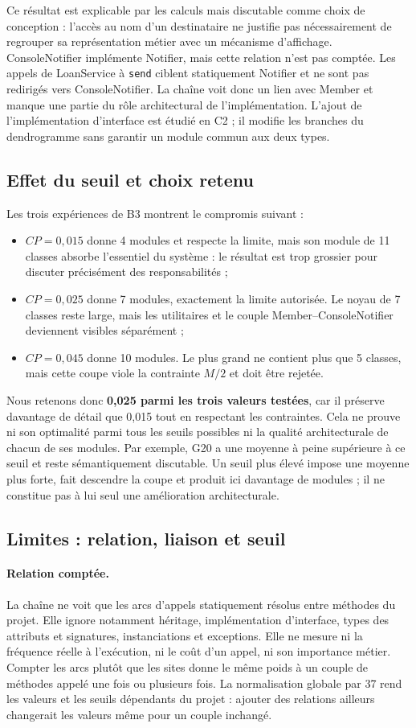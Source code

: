 \documentclass[11pt,a4paper]{article}
\begin{document}
Ce résultat est explicable par les calculs mais discutable comme choix de
conception : l'accès au nom d'un destinataire ne justifie pas nécessairement
de regrouper sa représentation métier avec un mécanisme d'affichage.
ConsoleNotifier implémente Notifier, mais cette relation n'est pas comptée.
Les appels de LoanService à \texttt{send} ciblent statiquement Notifier et
ne sont pas redirigés vers ConsoleNotifier. La chaîne voit donc un lien avec
Member et manque une partie du rôle architectural de l'implémentation.
L'ajout de l'implémentation d'interface est étudié en C2 ; il modifie les
branches du dendrogramme sans garantir un module commun aux deux types.

\subsection{Effet du seuil et choix retenu}
Les trois expériences de B3 montrent le compromis suivant :
\begin{itemize}
\item $CP=0{,}015$ donne 4 modules et respecte la limite, mais son module de
11 classes absorbe l'essentiel du système : le résultat est trop grossier
pour discuter précisément des responsabilités ;
\item $CP=0{,}025$ donne 7 modules, exactement la limite autorisée. Le noyau
de 7 classes reste large, mais les utilitaires et le couple Member--ConsoleNotifier
deviennent visibles séparément ;
\item $CP=0{,}045$ donne 10 modules. Le plus grand ne contient plus que
5 classes, mais cette coupe viole la contrainte $M/2$ et doit être rejetée.
\end{itemize}
Nous retenons donc \textbf{0,025 parmi les trois valeurs testées}, car il
préserve davantage de détail que 0,015 tout en respectant les contraintes.
Cela ne prouve ni son optimalité parmi tous les seuils possibles ni la qualité
architecturale de chacun de ses modules. Par exemple, G20 a une moyenne à peine
supérieure à ce seuil et reste sémantiquement discutable. Un seuil plus élevé
impose une moyenne plus forte, fait descendre la coupe et produit ici davantage
de modules ; il ne constitue pas à lui seul une amélioration architecturale.

\subsection{Limites : relation, liaison et seuil}
\paragraph{Relation comptée.}
La chaîne ne voit que les arcs d'appels statiquement résolus entre méthodes
du projet. Elle ignore notamment héritage, implémentation d'interface, types
des attributs et signatures, instanciations et exceptions. Elle ne mesure ni
la fréquence réelle à l'exécution, ni le coût d'un appel, ni son importance
métier. Compter les arcs plutôt que les sites donne le même poids à un couple
de méthodes appelé une fois ou plusieurs fois. La normalisation globale par
37 rend les valeurs et les seuils dépendants du projet : ajouter des relations
ailleurs changerait les valeurs même pour un couple inchangé.
\end{document}
